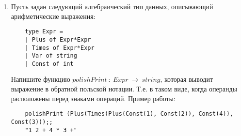 \documentclass[a4paper,11pt]{article}
\newcommand{\<}{\langle}
\renewcommand{\>}{\rangle}
\begin{document}
\begin{enumerate}
\item Пусть задан следующий алгебраический тип данных, описывающий
  арифметические выражения:
  \begin{lstlisting}
    type Expr = 
    | Plus of Expr*Expr
    | Times of Expr*Expr
    | Var of string
    | Const of int
  \end{lstlisting}
  Напишите функцию $polishPrint~:~Expr~\rightarrow~string$, которая выводит
  выражение в обратной польской нотации. Т.е. в таком виде, когда операнды
  расположены перед знаками операций. Пример работы:
  \begin{lstlisting}
    polishPrint (Plus(Times(Plus(Const(1), Const(2)), Const(4)), Const(3)));;
    "1 2 + 4 * 3 +"
  \end{lstlisting}
\end{enumerate}
\end{document}
